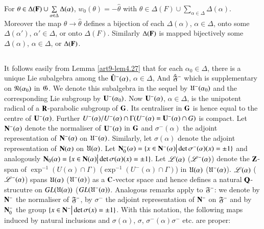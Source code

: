 \setcounter{definition}{26}
\begin{lemma}\label{art9-lem4.27}
For $\theta \in \Delta (\mathbf{F}) \cup \sum\limits_{\alpha \in \Delta} \Delta (\alpha)$, $w_0(\theta) = - \hat{\theta}$ with $\theta \in \Delta (F) \cup \sum\limits_{\alpha \in \Delta} \Delta (\alpha)$. Moreover the map $\theta \to \hat{\theta}$ defines a bijection of each $\Delta (\alpha)$, $\alpha \in \Delta$, onto some $\Delta (\alpha')$, $\alpha' \in \Delta$, or onto $\Delta (F)$. Similarly $\Delta(\mathbf{F})$ is mapped bijectively some $\Delta (\alpha)$, $\alpha \in \Delta$, or $\Delta (\mathbf{F})$.
 \end{lemma}

\setcounter{subsection}{27}
\subsection{}\label{art9-subsec4.28}
It follows easily from Lemma \ref{art9-lem4.27} that for each $\alpha_0 \in \Delta$, there is a unique Lie subalgebra among the $\hat{\mathbf{U}}^- (\alpha)$, $\alpha \in \Delta$, And $\hat{\mathfrak{F}}^-$ which is supplementary on $\mathfrak{N} (\alpha_0)$ in $\mathfrak{G}$. We denote this subalgebra in the sequel by $\mathfrak{U}^-(\alpha_0)$ and the corresponding Lie subgroup by $\mathbf{U}^-(\alpha_0)$. Now $\mathbf{U}^-(\alpha)$, $\alpha \in\Delta$, is the unipotent radical of a $\mathbf{R}$-parabolic subgroup of $\mathbf{G}$. Its centraliser in $\mathbf{G}$ is hence equal to the centre of $\mathbf{U}^-(\alpha)$. Further $U^-(\alpha)/ U^- (\alpha) \cap \Gamma (U^-(\alpha) = \mathbf{U}^-(\alpha) \cap G)$ is compact. Let $\mathbf{N}^-(\alpha)$ denote the normaliser of $\mathbf{U}^-(\alpha)$ in $\mathbf{G}$ and $\sigma^-(\alpha)$ the adjoint representation of $\mathbf{N}^-(\alpha)$ on $\mathfrak{U}^-(\alpha)$. Similarly, let $\sigma (\alpha)$ denote the adjoint representation of $\mathbf{N} (\alpha)$ on $\mathfrak{U}(\alpha)$. Let $\mathbf{N}^-_0 (\alpha) = \{x \in \mathbf{N}^-(\alpha) \big| \det \sigma^-(\alpha) (x) = \pm 1\}$ and analogously $\mathbf{N}_0 (\alpha) = \{x \in \mathbf{N} (\alpha) \big| \det \sigma (\alpha) (x) = \pm 1\}$. Let $\mathscr{L}(\alpha)$ (\resp $\mathscr{L}^-(\alpha)$) denote the $\mathbf{Z}$-span of $\exp^{-1} (U (\alpha) \cap \Gamma)$ (\resp $\exp^{-1} (U^- (\alpha) \cap \Gamma)$) in $\mathfrak{U}(\alpha)$ (\resp $\mathfrak{U}^-(\alpha)$). $\mathscr{L}(\alpha)$ (\resp $\mathscr{L}^-(\alpha)$) spans $\mathfrak{U}(\alpha)$ (\resp $\mathfrak{U}^-(\alpha)$) as a $\mathbf{C}$-vector space and hence defines a natural $\mathbf{Q}$-strucutre  on $GL (\mathfrak{U}(\alpha))$ (\resp $GL(\mathfrak{U}^-(\alpha))$. Analogous remarks apply to $\mathfrak{F}^-$: we denote by $\mathbf{N}^-$ the normaliser of $\mathfrak{F}^-$, by $\sigma^-$ the adjoint representation of $\mathbf{N}^-$ on $\mathfrak{F}^-$ and by $\mathbf{N}^-_0$ the group $\{x \in \mathbf{N}^-\big| \det \sigma (x) = \pm 1\}$. With this notation, the following maps induced by natural inclusions and $\sigma (\alpha)$, $\sigma$, $\sigma^-(\alpha) \sigma^-$  etc. are proper:
